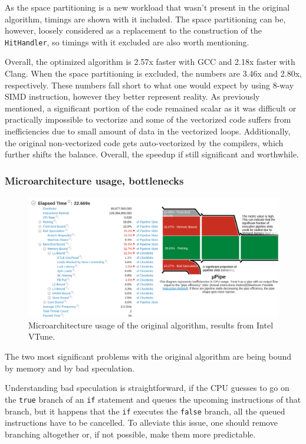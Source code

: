 \documentclass[12pt]{article}
\newcommand{\code}[1]{\texttt{#1}}
\begin{document}
As the space partitioning is a new workload that wasn't present in the original algorithm, timings are shown with it included. The space partitioning can be, however, loosely considered as a replacement to the construction of the \code{HitHandler}, so timings with it excluded are also worth mentioning.

Overall, the optimized algorithm is 2.57x faster with GCC and 2.18x faster with Clang. When the space partitioning is excluded, the numbers are 3.46x and 2.80x, respectively. These numbers fall short to what one would expect by using 8-way SIMD instruction, however they better represent reality. As previously mentioned, a significant portion of the code remained scalar as it was difficult or practically impossible to vectorize and some of the vectorized code suffers from inefficiencies due to small amount of data in the vectorized loops. Additionally, the original non-vectorized code gets auto-vectorized by the compilers, which further shifts the balance. Overall, the speedup if still significant and worthwhile.


\subsubsection{Microarchitecture usage, bottlenecks}

\begin{figure}[H]
	\begin{center}
		\includegraphics[width=\textwidth]{velout_uarch_overall_orig}
	\end{center}
	\caption{Microarchitecture usage of the original algorithm, results from Intel VTune.}
	\label{fig_velout_uarch_overall_orig}
\end{figure}

The two most significant problems with the original algorithm are being bound by memory and by bad speculation.

Understanding bad speculation is straightforward, if the CPU guesses to go on the \code{true} branch of an \code{if} statement and queues the upcoming instructions of that branch, but it happens that the \code{if} executes the \code{false} branch, all the queued instructions have to be cancelled.\cite{intel_vtune_docs} To alleviate this issue, one should remove branching altogether or, if not possible, make them more predictable.
\end{document}
